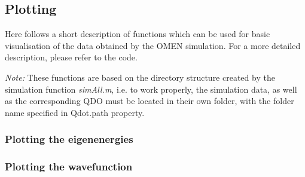 \subsection{Plotting}

Here follows a short description of functions which can be used for basic visualisation of the data obtained by the OMEN simulation. For a more detailed description, please refer to the code.

\textit{Note:}
These functions are based on the directory structure created by the simulation function \textit{simAll.m}, i.e. to work properly, the simulation data, as well as the corresponding QDO must be located in their own folder, with the folder name specified in Qdot.path property.

\subsubsection{Plotting the eigenenergies}
\subsubsection{Plotting the wavefunction}

